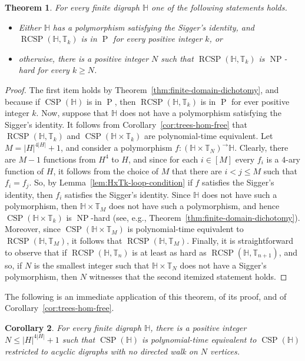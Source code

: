 \documentclass{article}
\newtheorem{theorem}{Theorem}
\newtheorem{corollary}[theorem]{Corollary}
\theoremstyle{definition}
\theoremstyle{remark}
\DeclareMathOperator{\NP}{NP}
\DeclareMathOperator{\cP}{P}
\DeclareMathOperator{\CSP}{CSP}
\DeclareMathOperator{\RCSP}{RCSP}
\newcommand{\bH}{{\mathbb H}}
\newcommand{\bT}{{\mathbb T}}
\begin{document}
\begin{theorem}\label{thm:RCSP(H,TTk)}
    For every finite digraph $\bH$ one of the following statements holds.
    \begin{itemize}
        \item Either $\bH$ has a polymorphism satisfying the Sigger's identity, and $\RCSP(\bH,\bT_k)$ is in $\cP$ for
        every positive integer $k$, or
        \item otherwise, there is a positive integer $N$ such that  $\RCSP(\bH,\bT_k)$ is $\NP$-hard for every $k\ge N$.
    \end{itemize}
\end{theorem}
\begin{proof}
    The first item holds by Theorem~\ref{thm:finite-domain-dichotomy}, and because
    if $\CSP(\bH)$ is in $\cP$, then $\RCSP(\bH,\bT_k)$ is in $\cP$ for ever positive integer
    $k$. Now, suppose that $\bH$ does not have a polymorphism satisfying the Sigger's
    identity. It follows from Corollary~\ref{cor:trees-hom-free} that $\RCSP(\bH,\bT_k)$ and
    $\CSP(\bH\times \bT_k)$ are polynomial-time equivalent. Let $M = |H|^{4|H|}+1$,
    and consider a polymorphism $f\colon (\bH\times \bT_N)^\to \bH$. Clearly, there
    are $M-1$ functions from $H^4$ to $H$, and since for each $i\in[M]$ every $f_i$
    is a  $4$-ary function of $H$, it follows from the choice of $M$ that there are
    $i < j \le M$  such that $f_i = f_j$. So, by Lemma~\ref{lem:HxTk-loop-condition}
    if $f$ satisfies the Sigger's identity, then $f_i$ satisfies the Sigger's identity.
    Since $\bH$ does not have such a polymorphism, then $\bH\times \bT_M$ does not have
    such a polymorphism, and hence $\CSP(\bH\times \bT_k)$ is $\NP$-hard (see, e.g., 
    Theorem~\ref{thm:finite-domain-dichotomy}). Moreover, since $\CSP(\bH\times \bT_M)$
    is polynomial-time equivalent to $\RCSP(\bH,\bT_M)$, it follows that 
    $\RCSP(\bH,\bT_M)$. Finally, it is straightforward to observe that
    if $\RCSP(\bH, \bT_n)$ is at least as hard as $\RCSP(\bH,\bT_{n+1})$,
    and so, if $N$ is the smallest integer such that $\bH\times \bT_N$ does
    not have a Sigger's polymorphism, then $N$ witnesses that the second
    itemized statement holds.
\end{proof}

The following is an immediate application of this theorem, of its proof, and of
Corollary~\ref{cor:trees-hom-free}.

\begin{corollary}\label{cor:CSPH-forbidden-walks}
    For every finite digraph $\bH$, there is a positive integer $N\le |H|^{4|H|}+1$ such that
    $\CSP(\bH)$ is polynomial-time equivalent to $\CSP(\bH)$ restricted to acyclic digraphs with no
    directed walk on $N$ vertices. 
\end{corollary}
\end{document}
